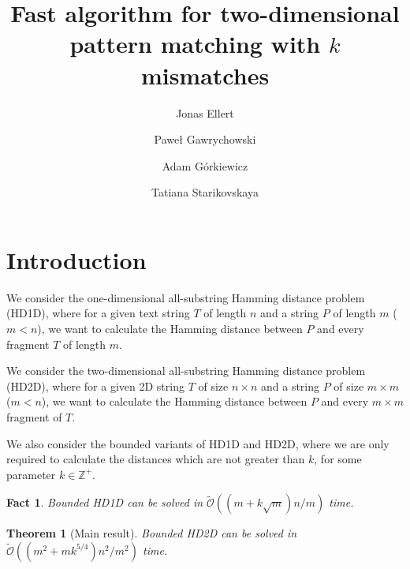 \documentclass[11pt]{article}
\title{Fast algorithm for two-dimensional pattern matching with $k$ mismatches}
\author[1]{Jonas Ellert}
\author[2]{Paweł Gawrychowski}
\author[3]{Adam Górkiewicz}
\author[4]{Tatiana Starikovskaya}
\affil[1]{?}
\affil[2]{?}
\affil[3]{?}
\affil[4]{?}
\newcommand{\Z}{\mathbb{Z}}
\newcommand{\tO}{\tilde{\mathcal{O}}}
\theoremstyle{plain}
\newtheorem{theorem}{Theorem}
\newtheorem{fact}{Fact}
\theoremstyle{definition}
\theoremstyle{remark}
\begin{document}
\date{}
\maketitle

\begin{abstract}
\end{abstract}



\section{Introduction}



\newcommand{\hd}{\textsc{HD1D}\xspace}
\newcommand{\HD}{\textsc{HD2D}\xspace}

We consider the one-dimensional all-substring Hamming distance problem (\hd), where for a given text string $T$ of length $n$ and a string $P$ of length $m$ ($m < n$), we want to calculate the Hamming distance between $P$ and every fragment $T$ of length $m$.

We consider the two-dimensional all-substring Hamming distance problem (\HD), where for a given 2D string $T$ of size $n \times n$ and a string $P$ of size $m \times m$ ($m < n$), we want to calculate the Hamming distance between $P$ and every $m \times m$ fragment of $T$.

We also consider the bounded variants of \hd and \HD, where we are only required to calculate the distances which are not greater than $k$, for some parameter $k \in \Z^+$.

\begin{fact}
	Bounded \hd can be solved in $\tO((m + k \sqrt{m})n / m)$ time.
\end{fact}


\begin{theorem}[Main result]\label{main result}
	Bounded \HD can be solved in $\tO((m^2 + mk^{5/4})n^2 / m^2)$ time.
\end{theorem}
\end{document}
